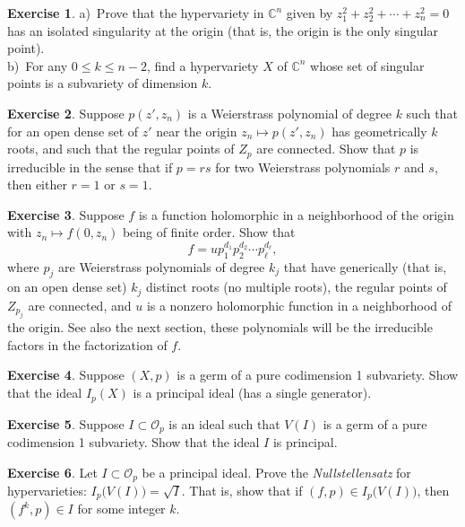 \documentclass[12pt,openany]{book}
\newcommand{\C}{{\mathbb{C}}}
\newcommand{\sO}{{\mathscr{O}}}
\newcommand{\myindex}[1]{#1\index{#1}}
\theoremstyle{plain}
\theoremstyle{remark}
\theoremstyle{definition}
\newenvironment{exbox}{%
    \def\FrameCommand{\vrule width 1pt \relax\hspace {10pt}}%
    \MakeFramed {\advance \hsize -\width \FrameRestore }%
}{%
    \endMakeFramed
}
\theoremstyle{exercise}
\newtheorem{exercise}{Exercise}[section]
\theoremstyle{example}
\begin{document}
\begin{exbox}
\begin{exercise}
a)~Prove that the hypervariety in $\C^n$ given by $z_1^2 + z_2^2 + \cdots + z_n^2 = 0$
has an isolated singularity at the origin (that is, the origin is the only
singular point).\\
b)~For any $0 \leq k \leq n-2$, find a hypervariety $X$ of $\C^n$ whose set
of singular points is a subvariety of dimension $k$.
\end{exercise}

\begin{exercise}
Suppose $p(z',z_n)$ is a Weierstrass polynomial of degree $k$ such that
for an open dense set of $z'$ near the origin 
$z_n \mapsto p(z',z_n)$ has geometrically $k$ roots, and such that the
regular points of $Z_p$ are connected.  Show that $p$ is
irreducible in the sense that if $p = rs$ for two Weierstrass polynomials
$r$ and $s$, then either $r=1$ or $s=1$.
\end{exercise}

\begin{samepage}
\begin{exercise}
Suppose $f$ is a function holomorphic in a neighborhood of the origin with
$z_n \mapsto f(0,z_n)$ being of finite order.  Show that
\begin{equation*}
f = u p_1^{d_1} p_2^{d_2} \cdots p_\ell^{d_\ell} ,
\end{equation*}
where $p_j$ are Weierstrass polynomials of degree $k_j$ that have
generically (that is, on an open dense set) $k_j$ distinct roots
(no multiple roots), the regular points of $Z_{p_j}$ are
connected, and $u$ is a nonzero holomorphic function
in a neighborhood of the origin.  See also the next section, these
polynomials will be the irreducible factors in the factorization of $f$.
\end{exercise}
\end{samepage}

\begin{exercise}
Suppose $(X,p)$ is a germ of a pure codimension 1 subvariety.  Show that
the ideal $I_p(X)$ is a principal ideal (has a single generator).
\end{exercise}

\begin{exercise}
Suppose $I \subset \sO_p$ is an ideal such that $V(I)$ is a germ of a pure codimension 1 subvariety.  Show that
the ideal $I$ is principal.
\end{exercise}

\begin{exercise}
Let $I \subset \sO_p$ be a principal ideal.  Prove the
\emph{\myindex{Nullstellensatz}} for hypervarieties: 
$I_p\bigl(V(I)\bigr) = \sqrt{I}$.  That is, show that if 
$(f,p) \in I_p\bigl(V(I)\bigr)$, then $(f^k,p) \in I$ for some integer $k$.
\end{exercise}
\end{exbox}
\end{document}
